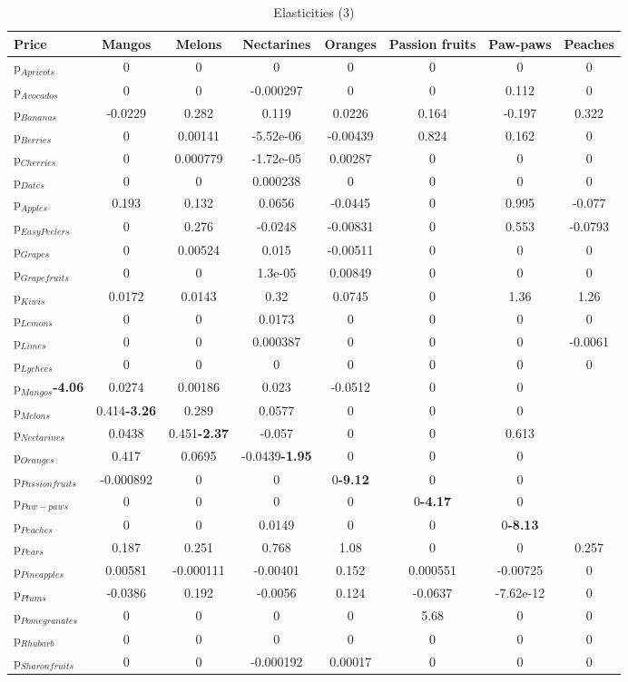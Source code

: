 \documentclass[11pt]{article}
\begin{document}
\begin{table}[h]
\caption{Elasticities (3)}
\label{table:elasticities 3}
\begin{center}
\begin{tabular}{lccccccc} \hline \hline
Price &Mangos &Melons &Nectarines &Oranges &Passion fruits &Paw-paws &Peaches \\ \hline
p$_{Apricots}$ &0 &0 &0 &0 &0 &0 &0 \\
p$_{Avocados}$ &0 &0 &-0.000297 &0 &0 &0.112 &0 \\
p$_{Bananas}$ &-0.0229 &0.282 &0.119 &0.0226 &0.164 &-0.197 &0.322 \\
p$_{Berries}$ &0 &0.00141 &-5.52e-06 &-0.00439 &0.824 &0.162 &0 \\
p$_{Cherries}$ &0 &0.000779 &-1.72e-05 &0.00287 &0 &0 &0 \\
p$_{Dates}$ &0 &0 &0.000238 &0 &0 &0 &0 \\
p$_{Apples}$ &0.193 &0.132 &0.0656 &-0.0445 &0 &0.995 &-0.077 \\
p$_{Easy Peelers}$ &0 &0.276 &-0.0248 &-0.00831 &0 &0.553 &-0.0793 \\
p$_{Grapes}$ &0 &0.00524 &0.015 &-0.00511 &0 &0 &0 \\
p$_{Grapefruits}$ &0 &0 &1.3e-05 &0.00849 &0 &0 &0 \\
p$_{Kiwis}$ &0.0172 &0.0143 &0.32 &0.0745 &0 &1.36 &1.26 \\
p$_{Lemons}$ &0 &0 &0.0173 &0 &0 &0 &0 \\
p$_{Limes}$ &0 &0 &0.000387 &0 &0 &0 &-0.0061 \\
p$_{Lychees}$ &0 &0 &0 &0 &0 &0 &0 \\
p$_{Mangos}$\textbf{-4.06} &0.0274 &0.00186 &0.023 &-0.0512 &0 &0 \\
p$_{Melons}$ &0.414\textbf{-3.26} &0.289 &0.0577 &0 &0 &0 \\
p$_{Nectarines}$ &0.0438 &0.451\textbf{-2.37} &-0.057 &0 &0 &0.613 \\
p$_{Oranges}$ &0.417 &0.0695 &-0.0439\textbf{-1.95} &0 &0 &0 \\
p$_{Passion fruits}$ &-0.000892 &0 &0 &0\textbf{-9.12} &0 &0 \\
p$_{Paw-paws}$ &0 &0 &0 &0 &0\textbf{-4.17} &0 \\
p$_{Peaches}$ &0 &0 &0.0149 &0 &0 &0\textbf{-8.13} \\
p$_{Pears}$ &0.187 &0.251 &0.768 &1.08 &0 &0 &0.257 \\
p$_{Pineapples}$ &0.00581 &-0.000111 &-0.00401 &0.152 &0.000551 &-0.00725 &0 \\
p$_{Plums}$ &-0.0386 &0.192 &-0.0056 &0.124 &-0.0637 &-7.62e-12 &0 \\
p$_{Pomegranates}$ &0 &0 &0 &0 &5.68 &0 &0 \\
p$_{Rhubarb}$ &0 &0 &0 &0 &0 &0 &0 \\
p$_{Sharon fruits}$ &0 &0 &-0.000192 &0.00017 &0 &0 &0 \\
\end{tabular}
\end{center}
\end{table}
\end{document}
